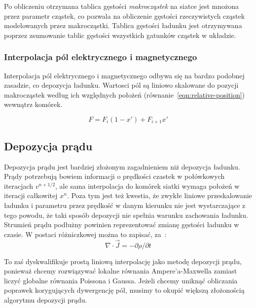 Po obliczeniu otrzymana tablica gęstości \emph{makrocząstek} na
siatce jest mnożona przez parametr  cząstek, co pozwala na
obliczenie gęstości rzeczywistych cząstek modelowanych przez makrocząstki.
Tablica gęstości ładunku jest otrzymywana poprzez zsumowanie tablic gęstości
wszystkich gatunków cząstek w układzie.

\subsubsection{Interpolacja pól elektrycznego i magnetycznego}

Interpolacja pól elektrycznego i magnetycznego odbywa się na bardzo podobnej
zasadzie, co depozycja ładunku. Wartosci pól są liniowo skalowane do pozycji
makrocząstek według ich względnych położeń (równanie~\ref{eqn:relative-position}) wewnątrz komórek.

\begin{equation}
    F = F_i (1-x') + F_{i+1} x'
    \label{eqn:field-interpolation}
\end{equation}

\subsection{Depozycja prądu}

Depozycja prądu jest bardziej złożonym zagadnieniem niż depozycja ładunku.
Prądy potrzebują bowiem informacji o prędkości czastek w połówkowych
iteracjach $v^{n+1/2}$, ale sama interpolacja do komórek siatki wymaga
położeń w iteracji całkowitej $x^{n}$. Poza tym jest też kwestia, że zwykłe
liniowe przeskalowanie ładunku i parametru  przez prędkość w
danym kierunku nie jest wystarczające z tego powodu, że taki sposób
depozycji nie spełnia warunku zachowania ładunku. Strumień prądu podłużny
powinien reprezentować zmianę gęstości ładunku w czasie. W postaci różniczkowej
można to zapisać, za~\cite{bunemanvillasenor}:
\begin{equation}
\nabla \cdot \vec{J} = -\partial \rho / \partial t
\label{eqn:charge-conservation-condition}
\end{equation}

To zaś dyskwalifikuje prostą liniową interpolację jako metodę depozycji
prądu, ponieważ chcemy rozwiązywać lokalne równania Ampere'a-Maxwella
zamiast liczyć globalne równania Poissona i Gaussa.
Jeżeli chcemy uniknąć obliczania poprawek korygujących dywergencję pól,
musimy to okupić większą złożonością algorytmu depozycji prądu.

